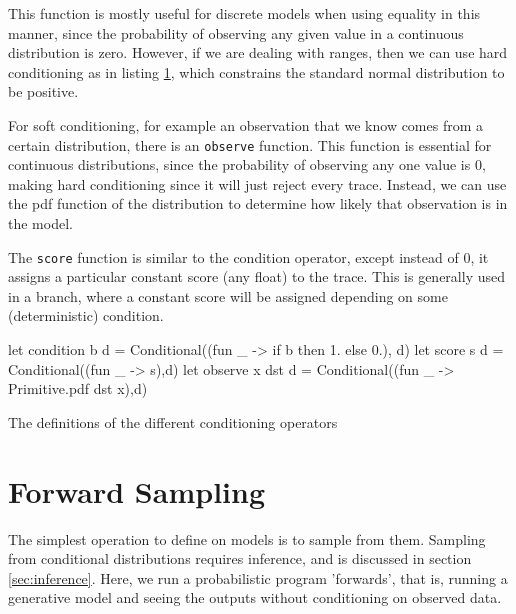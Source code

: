 This function is mostly useful for discrete models when using equality in this manner, since the probability of observing any given value in a continuous distribution is zero. However, if we are dealing with ranges, then we can use hard conditioning as in listing \ref{lst:half_normal}, which constrains the standard normal distribution to be positive.

\begin{figure}[!htb]
	\begin{minipage}{0.5\textwidth}
		\label{lst:dice}
	\end{minipage}
	\begin{minipage}{0.5\textwidth}
		\label{lst:half_normal}
	\end{minipage}
\end{figure}

For soft conditioning, for example an observation that we know comes from a certain distribution, there is an \texttt{observe} function. This function is essential for continuous distributions, since the probability of observing any one value is 0, making hard conditioning since it will just reject every trace. Instead, we can use the pdf function of the distribution to determine how likely that observation is in the model.

The \texttt{score} function is similar to the condition operator, except instead of 0, it assigns a particular constant score (any float) to the trace. This is generally used in a branch, where a constant score will be assigned depending on some (deterministic) condition.
	
\begin{listing}[!htb]
	\centering
	\begin{ocamlcode-in}
let condition b d = Conditional((fun _ -> if b then 1. else 0.), d)
let score s d = Conditional((fun _ -> s),d)
let observe x dst d = Conditional((fun _ -> Primitive.pdf dst x),d) 
	\end{ocamlcode-in}	
	\caption{The definitions of the different conditioning operators}
	\label{lst:cond}
\end{listing}
	
\section{Forward Sampling}
The simplest operation to define on models is to sample from them. Sampling from conditional distributions requires inference, and is discussed in section \ref{sec:inference}. Here, we run a probabilistic program 'forwards', that is, running a generative model and seeing the outputs without conditioning on observed data.
		

